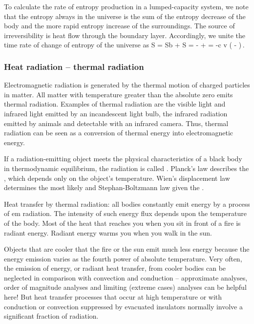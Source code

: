 To calculate the rate of entropy production in a lumped-capacity system, we note that the entropy always in the universe is the sum of the entropy decrease of the body and the more rapid entropy increase of the surroundings. The source of irreversibility is heat flow through the boundary layer. Accordingly, we unite the time rate of change of entropy of the universe as
\beq
\dt S = \dt S\txt b + \dt S
              = - + 
              = -\rho c v \left( - \right)\,.
\eeq


\subsubsection{Heat radiation -- thermal radiation}
Electromagnetic radiation is generated by the thermal motion of charged particles in matter. All matter with temperature greater than the absolute zero emits thermal radiation. Examples of thermal radiation are the visible light and infrared light emitted by an incandescent light bulb, the infrared radiation emitted by animals and detectable with an infrared camera. Thus, thermal radiation can be seen as a conversion of thermal energy into electromagnetic energy.

If a radiation-emitting object meets the physical characteristics of a black body in thermodynamic equilibrium, the radiation is called . Planck's law describes the , which depends only on the object's temperature. Wien's displacement law  determines the most likely  and Stephan-Boltzmann law given the .

Heat transfer by thermal radiation: all bodies constantly emit energy by a process of em radiation. The intensity of such energy flux depends upon the temperature of the body. Most of the heat that reaches you when you sit in front of a fire is radiant energy. Radiant energy warms you when you walk in the sun.

Objects that are cooler that the fire or the sun emit much less energy because the energy emission varies as the fourth power of absolute temperature. Very often, the emission of energy, or radiant heat transfer, from cooler bodies can be neglected in comparison with convection and conduction -- approximate analyses, order of magnitude analyses and limiting (extreme cases) analyses can be helpful here! But heat transfer processes that occur at high temperature or with conduction or convection suppressed by evacuated insulators normally involve a significant fraction of radiation.

